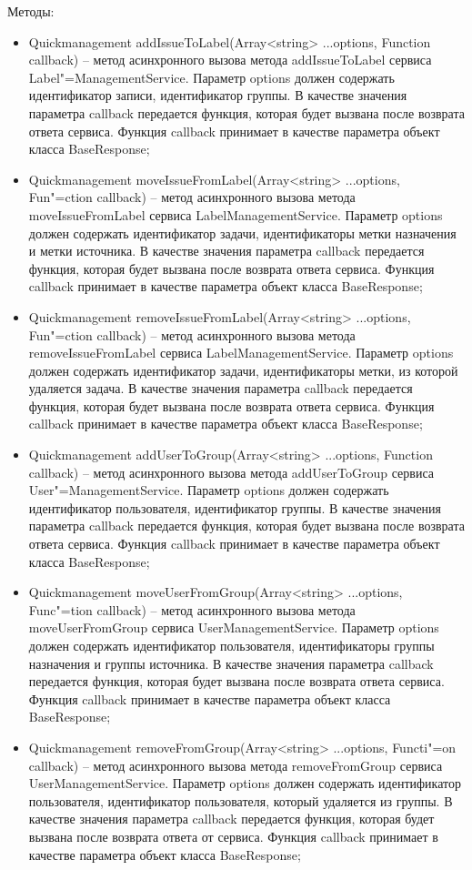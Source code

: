 Методы:
\begin{itemize}
  \item Quickmanagement addIssueToLabel(Array<string> ...options, Function callback) – метод асинхронного вызова метода addIssueToLabel сервиса Label"=ManagementService. Параметр options должен содержать идентификатор записи, идентификатор группы. В качестве значения параметра callback передается функция, которая будет вызвана после возврата ответа сервиса. Функция callback принимает в качестве параметра объект класса BaseResponse;
  \item Quickmanagement moveIssueFromLabel(Array<string> ...options, Fun"=ction callback) – метод асинхронного вызова метода moveIssueFromLabel сервиса LabelManagementService. Параметр options должен содержать идентификатор задачи, идентификаторы метки назначения и метки источника. В качестве значения параметра callback передается функция, которая будет вызвана после возврата ответа сервиса. Функция callback принимает в качестве параметра объект класса BaseResponse;
  \item Quickmanagement removeIssueFromLabel(Array<string> ...options, Fun"=ction callback) – метод асинхронного вызова метода removeIssueFromLabel сервиса LabelManagementService. Параметр options должен содержать идентификатор задачи, идентификаторы метки, из которой удаляется задача. В качестве значения параметра callback передается функция, которая будет вызвана после возврата ответа сервиса. Функция callback принимает в качестве параметра объект класса BaseResponse;
  \item Quickmanagement addUserToGroup(Array<string> ...options, Function callback) – метод асинхронного вызова метода addUserToGroup сервиса User"=ManagementService. Параметр options должен содержать идентификатор пользователя, идентификатор группы. В качестве значения параметра callback передается функция, которая будет вызвана после возврата ответа сервиса. Функция callback принимает в качестве параметра объект класса BaseResponse;
  \item Quickmanagement moveUserFromGroup(Array<string> ...options, Func"=tion callback) – метод асинхронного вызова метода moveUserFromGroup сервиса UserManagementService. Параметр options должен содержать идентификатор пользователя, идентификаторы группы назначения и группы источника. В качестве значения параметра callback передается функция, которая будет вызвана после возврата ответа сервиса. Функция callback принимает в качестве параметра объект класса BaseResponse;
  \item Quickmanagement removeFromGroup(Array<string> ...options, Functi"=on callback) – метод асинхронного вызова метода removeFromGroup сервиса UserManagementService. Параметр options должен содержать идентификатор пользователя, идентификатор пользователя, который удаляется из группы. В качестве значения параметра callback передается функция, которая будет вызвана после возврата ответа от сервиса. Функция callback принимает в качестве параметра объект класса BaseResponse;

\end{itemize}
